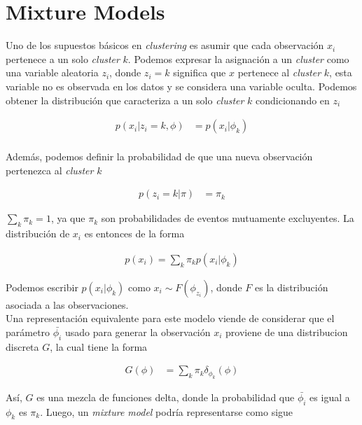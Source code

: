 \documentclass[letterpaper,12pt,oneside]{book} %
\begin{document}
\section{Mixture Models}
\label{sec:mixture_models}

Uno de los supuestos básicos en \textit{clustering} es asumir que cada observación $x_{i}$ pertenece a un solo \textit{cluster} $k$. Podemos expresar la asignación a un \textit{cluster} como una variable aleatoria $z_{i}$, donde $z_{i}=k$ significa que $x$ pertenece al \textit{cluster} $k$, esta variable no es observada en los datos y se considera una variable oculta. Podemos obtener la distribución que caracteriza a un solo \textit{cluster} $k$ condicionando en $z_{i}$

\begin{align}
    p(x_{i}|z_{i}=k, \phi) & = p(x_{i}|\phi_{k})\\
\end{align}

Además, podemos definir la probabilidad de que una nueva observación pertenezca al \textit{cluster} $k$ 

\begin{align}
    p(z_{i}=k|\pi) & = \pi_{k}
\end{align}

$\sum_{k}\pi_{k} = 1$, ya que $\pi_{k}$ son probabilidades de eventos mutuamente excluyentes. La distribución de $x_{i}$ es entonces de la forma

\begin{align}
    p(x_{i}) = \sum_{k}\pi_{k}p(x_{i}|\phi_{k})
\end{align}

Podemos escribir $p(x_{i}|\phi_{k})$ como $x_{i} \sim F(\phi_{z_{i}})$, donde $F$ es la distribución asociada a las observaciones. \\

Una representación equivalente para este modelo viende de considerar que el parámetro $\bar{\phi_{i}}$ usado para generar la observación $x_{i}$ proviene de una distribucion discreta $G$, la cual tiene la forma

\begin{align}
    G(\phi) & = \sum_{k} \pi_{k}\delta_{\phi_{k}}(\phi)
\end{align}

Así, $G$ es una mezcla de funciones delta, donde la probabilidad que $\bar{\phi_{i}}$ es igual a $\phi_{k}$ es $\pi_{k}$. Luego, un \textit{mixture model} podría representarse como sigue
\end{document}
